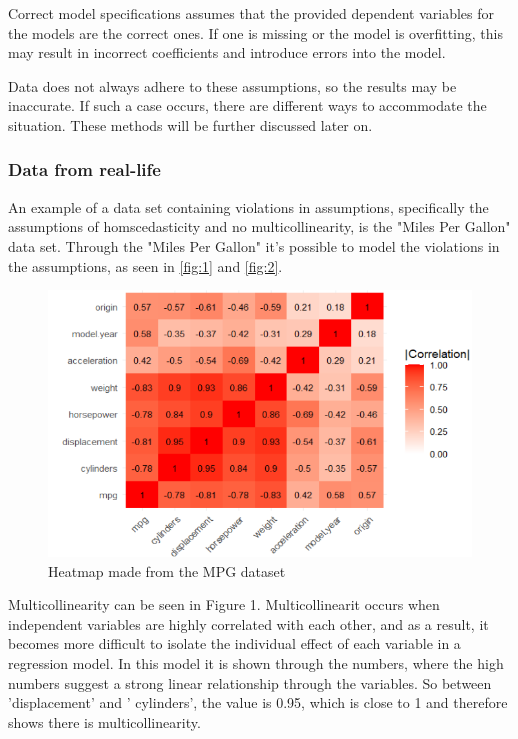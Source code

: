 \noindent Correct model specifications assumes that the provided dependent variables for the models are the correct ones. If one is missing or the model is overfitting, this may result in incorrect coefficients and introduce errors into the model. \newline

\noindent Data does not always adhere to these assumptions, so the results may be inaccurate. 
If such a case occurs, there are different ways to accommodate the situation. These methods will be further discussed later on. \newline 

 

\subsubsection{Data from real-life}
An example of a data set containing violations in assumptions, specifically the assumptions of homscedasticity and no multicollinearity, is the "Miles Per Gallon" data set. Through the "Miles Per Gallon" it's possible to model the violations in the assumptions, as seen in \autoref{fig:1} and \autoref{fig:2}.
\newline

\begin{figure}
	\centering
	\centering
	\includegraphics{billder/1.png}
	\caption{Heatmap made from the MPG dataset}
	\label{fig:1}
\end{figure}

\noindent Multicollinearity can be seen in Figure 1. Multicollinearit occurs when independent variables are highly correlated with each other, and as a result, it becomes more difficult to isolate the individual effect of each variable in a regression model.
In this model it is shown through the numbers, where the high numbers suggest a strong linear relationship through the variables. So between 'displacement' and ' cylinders', the value is 0.95, which is close to 1 and therefore shows there is multicollinearity. \newline

